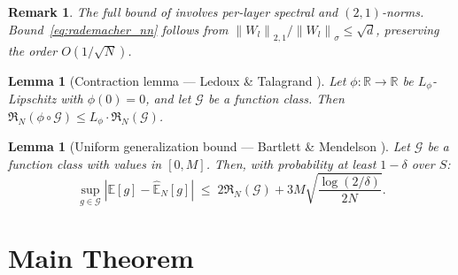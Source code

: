 \documentclass[12pt]{article}
\newtheorem{lemma}[theorem]{Lemma}
\newtheorem{remark}{Remark}
\newcommand{\R}{\mathbb{R}}
\newcommand{\E}{\mathbb{E}}
\newcommand{\norm}[1]{\left\|#1\right\|}
\newcommand{\abs}[1]{\left|#1\right|}
\newcommand{\Rad}{\mathfrak{R}}
\begin{document}
\begin{remark}
The full bound of \cite{Golowich2018} involves per-layer spectral
and $(2,1)$-norms.
Bound~\eqref{eq:rademacher_nn} follows from
$\norm{W_l}_{2,1}/\norm{W_l}_\sigma \le \sqrt{d}$,
preserving the order $O(1/\sqrt{N})$.
\end{remark}

\begin{lemma}[Contraction lemma --- Ledoux \& Talagrand
\cite{Ledoux1991}]
\label{lema:contraccion}
Let $\phi: \R \to \R$ be $L_\phi$-Lipschitz with $\phi(0) = 0$,
and let $\mathcal{G}$ be a function class.
Then
$\Rad_N(\phi \circ \mathcal{G})
\le L_\phi \cdot \Rad_N(\mathcal{G})$.
\end{lemma}

\begin{lemma}[Uniform generalization bound --- Bartlett \& Mendelson
\cite{Bartlett2002}]
\label{lema:generalizacion}
Let $\mathcal{G}$ be a function class with values in $[0, M]$.
Then, with probability at least $1 - \delta$ over $S$:
\begin{equation}
  \sup_{g \in \mathcal{G}}
  \abs{\E[g] - \hat{\E}_N[g]}
  \;\le\; 2\Rad_N(\mathcal{G})
  + 3M\sqrt{\frac{\log(2/\delta)}{2N}}.
  \label{eq:generalizacion}
\end{equation}
\end{lemma}

\section{Main Theorem}
\label{sec:main}
\end{document}
